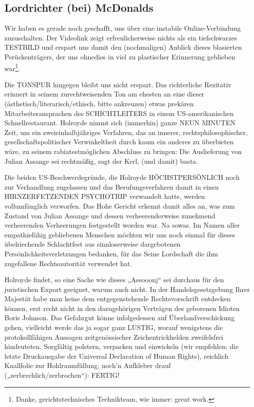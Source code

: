 \begin{multicols}{2}
\section{Lordrichter (bei) McDonalds}

Wir haben es gerade noch geschafft, uns über eine instabile Online-Verbindung zuzuschalten. Der Videolink zeigt erfreulicherweise nichts als ein tiefschwarzes
TESTBILD und erspart uns damit den (nochmaligen)
Anblick dieses blasierten Perückenträgers, der uns ohnedies in viel zu plastischer Erinnerung geblieben war\footnote[28]{Danke, gerichtstechnisches Technikteam, wie immer: great work.}.

Die TONSPUR hingegen bleibt uns nicht erspart. Das
richterliche Rezitativ erinnert in seinem zurechtweisenden Ton am ehesten an eine dieser (ästhetisch/literarisch/ethisch, bitte ankreuzen) etwas prekären Mitarbeiteransprachen des SCHICHTLEITERS in einem
US-amerikanischen Schnellrestaurant. Holroyde nimmt
sich (immerhin) ganze NEUN MINUTEN Zeit, um ein
zweieinhalbjähriges Verfahren, das an innerer, rechtsphilosophischer, gesellschaftspolitischer Verwinkeltheit
durch kaum ein anderes zu überbieten wäre, zu seinem
rabiatestmöglichen Abschluss zu bringen: Die Auslieferung von Julian Assange sei rechtmäßig, sagt der Kerl,
(und damit) basta.

Die beiden US-Beschwerdegründe, die Holroyde
HÖCHSTPERSÖNLICH noch zur Verhandlung zugelassen und das Berufungsverfahren damit in einen
HIRNZERFETZENDEN PSYCHOTRIP verwandelt hatte,
werden vollumfänglich verworfen. Das Hohe Gericht erkennt damit alles an, was zum Zustand von Julian Assange und dessen verheerenderweise zunehmend verheerenden Verheerungen festgestellt worden war. Na sowas.
Im Namen aller empathiefähig gebliebenen Menschen
möchten wir uns noch einmal für dieses übelriechende
Schlachtfest aus sinnloserweise dargebotenen Persönlichkeitsverletzungen bedanken, für das Seine Lordschaft die ihm zugefallene Rechtsautorität verwendet
hat.

Holroyde findet, so eine Sache wie dieses „Assooonj“
sei durchaus für den juristischen Export geeignet, warum auch nicht. In der Handelsgesetzgebung Ihrer Majestät habe man keine dem entgegenstehende Rechtsvorschrift entdecken können, erst recht nicht in den
dazugehörigen Verträgen des geborenen Idioten Boris Johnson. Das Gefahrgut könne infolgedessen auf Überlandverschickung gehen, vielleicht werde das ja sogar
ganz LUSTIG, worauf wenigstens die protokollfähigen
Aussagen zeitgenössischer Zeichentrickhelden zweifelsfrei hindeuteten. Sorgfältig polstern, verpacken und
einwickeln (wir empfehlen: die letzte Druckausgabe der
Universal Declaration of Human Rights), reichlich Knallfolie zur Hohlraumfüllung, noch’n Aufkleber drauf („zerbrechlich/zerbrochen“): FERTIG!


\end{multicols}
